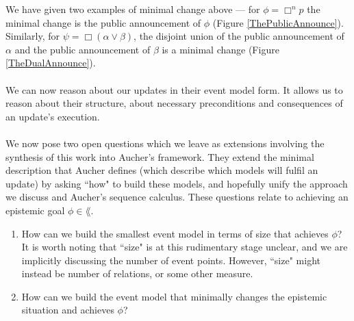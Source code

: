 We have given two examples of minimal change above --- for $\phi = \Box^n p$ the minimal change is
the public announcement of $\phi$ (Figure \ref{ThePublicAnnounce}).
Similarly, for $\psi = \Box(\alpha \lor \beta)$, the disjoint union of the public announcement of
$\alpha$ and the public announcement of $\beta$ is a minimal change (Figure \ref{TheDualAnnounce}).\\
\\
We can now reason about our updates in their event model form.
It allows us to reason about their structure, about necessary preconditions and consequences of an
update's execution.\\
\\
We now pose two open questions which we leave as extensions involving the synthesis of this work
into Aucher's framework.
They extend the minimal description that Aucher defines (which describe which models will fulfil an
update) by asking ``how" to build these models, and hopefully unify the approach we discuss and
Aucher's sequence calculus.
These questions relate to achieving an epistemic goal $\phi \in \lang$.
\begin{enumerate}
	\item How can we build the smallest event model in terms of size that achieves $\phi$?
		It is worth noting that ``size" is at this rudimentary stage unclear, and we are implicitly discussing the
		number of event points.
		However, ``size" might instead be number of relations, or some other measure.
	\item How can we build the event model that minimally changes the epistemic situation and achieves
		$\phi$?
\end{enumerate}
